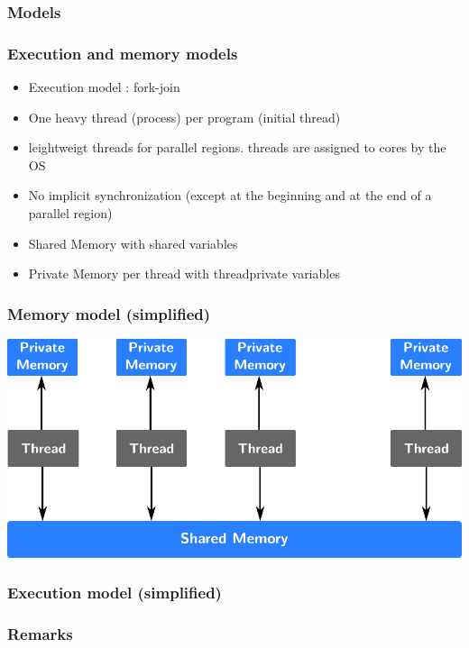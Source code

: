 \subsubsection{Models}

\begin{frame}
  \frametitle{Execution and memory models}
  \begin{itemize}
  \item{Execution model : fork-join}
  \item{One heavy thread (process) per program (initial thread)}
  \item{leightweigt threads for parallel regions. threads are assigned to cores by the OS}
  \item{No implicit synchronization (except at the beginning and at the end of a parallel region)}
  \item{Shared Memory with shared variables}
  \item{Private Memory per thread with threadprivate variables}
  \end{itemize}
\end{frame}

\begin{frame}
  \frametitle{Memory model (simplified)}
  \begin{center}
    {\includegraphics[width=\textwidth]{Day1/images/memory-model-simplified.pdf}}
  \end{center}
\end{frame}

\begin{frame}
  \frametitle{Execution model (simplified)}
  \begin{center}
    {}
  \end{center}
\end{frame}

\subsubsection{Remarks}

